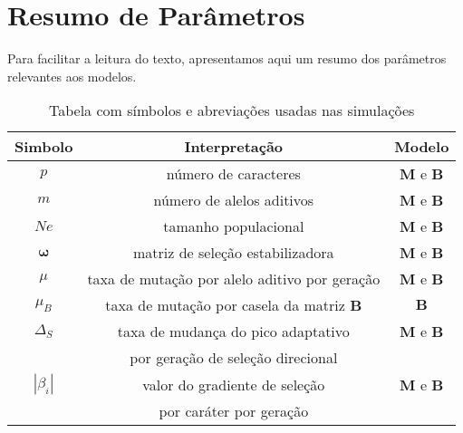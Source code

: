 \newpage
\section{Resumo de Parâmetros}

Para facilitar a leitura do texto, apresentamos aqui um resumo dos
parâmetros relevantes aos modelos.

\begin{table}[htbp]
    \caption[Tabela de abreviações]{Tabela com símbolos e abreviações
    usadas nas simulações}
    \label{tab:exemplo}
    \vspace{1em}
    \centering
    \begin{tabular}{c c c}
        \toprule
        Simbolo    & Interpretação & Modelo\\
        \midrule
        $p$        & número de caracteres & $\mathbf{M}$ e $\mathbf{B}$\\
        $m$        & número de alelos aditivos & $\mathbf{M}$ e $\mathbf{B}$\\
        $Ne$       & tamanho populacional & $\mathbf{M}$ e $\mathbf{B}$   \\
        $\pmb{\omega}$   & matriz de seleção estabilizadora & $\mathbf{M}$ e $\mathbf{B}$\\
        $\mu$      & taxa de mutação por alelo aditivo por geração & $\mathbf{M}$ e $\mathbf{B}$\\
        $\mu_B$    & taxa de mutação por casela da matriz $\mathbf{B}$ & $\mathbf{B}$\\
        $\Delta_S$ & taxa de mudança do pico adaptativo & $\mathbf{M}$ e $\mathbf{B}$\\
                   & por geração de seleção direcional & \\
        $|\beta_i|$& valor do gradiente de seleção        &$\mathbf{M}$ e $\mathbf{B}$\\ 
                   &   por caráter por geração            &  \\
        \bottomrule
    \end{tabular}
\end{table}
